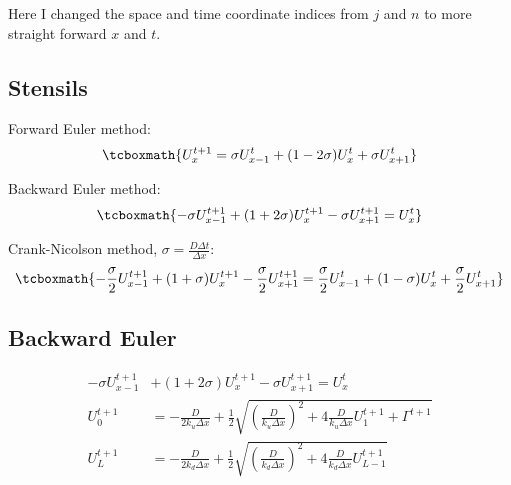 \documentclass[../summary.tex]{subfiles}
\begin{document}
    
Here I changed the space and time coordinate indices from $j$ and $n$ to more straight forward $x$ and $t$.
\subsection{Stensils}

Forward Euler method:
\begin{equation}
    \tcboxmath{
    U_{x}^{t+1} = \sigma U_{x-1}^{t} + (1-2\sigma)U_{x}^{t} + \sigma U_{x+1}^{t}
    }
\end{equation}

Backward Euler method:
\begin{equation}
    \tcboxmath{
    -\sigma U_{x-1}^{t+1} + (1+2\sigma)U_{x}^{t+1} - \sigma U_{x+1}^{t+1} = U_{x}^{t}
    }
\end{equation}

Crank-Nicolson method, $\sigma = \frac{D\Delta t}{\Delta x}$:
\begin{equation}
    \tcboxmath{
    -\frac{\sigma}{2} U_{x-1}^{t+1} + (1+\sigma)U_{x}^{t+1} - \frac{\sigma}{2} U_{x+1}^{t+1} = \frac{\sigma}{2} U_{x-1}^{t} + (1-\sigma)U_{x}^{t} + \frac{\sigma}{2} U_{x+1}^{t}
    }
\end{equation}

\subsection{Backward Euler}

\begin{align}
    -\sigma U_{x-1}^{t+1} &+ (1+2\sigma)U_{x}^{t+1} - \sigma U_{x+1}^{t+1} = U_{x}^{t}\\
    U_{0}^{t+1} &= -\frac{D}{2k_u\Delta x} + \frac{1}{2}\sqrt{\left(\frac{D}{k_u\Delta x}\right)^2 + 4\frac{D}{k_u\Delta x}U_{1}^{t+1} + \Gamma^{t+1}}\\
    U_{L}^{t+1} &= -\frac{D}{2k_d\Delta x} + \frac{1}{2}\sqrt{\left(\frac{D}{k_d\Delta x}\right)^2 + 4\frac{D}{k_d\Delta x}U_{L-1}^{t+1}}
\end{align}
\end{document}
